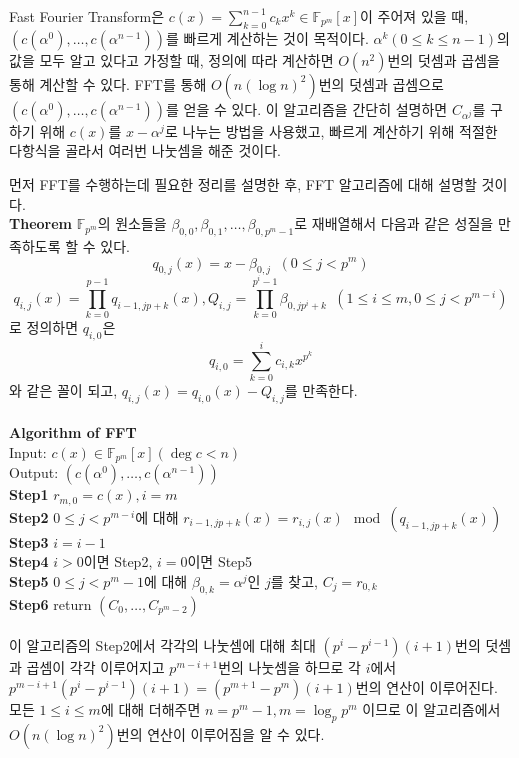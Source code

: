 \documentclass[11pt]{article}
\begin{document}
Fast Fourier Transform은 $c(x)=\sum_{k=0}^{n-1}c_{k}x^{k}\in\mathbb{F}_{p^{m}}[x]$이 주어져 있을 때,  $(c(\alpha^{0}),\dots,c(\alpha^{n-1}))$를 빠르게 계산하는 것이 목적이다. $\alpha^{k}(0\leq k\leq n-1)$의 값을 모두 알고 있다고 가정할 때, 정의에 따라 계산하면 $O(n^2)$번의 덧셈과 곱셈을 통해 계산할 수 있다.   FFT를 통해 $O(n(\log n)^2)$번의 덧셈과 곱셈으로 $(c(\alpha^{0}),\dots,c(\alpha^{n-1}))$를 얻을 수 있다. 이 알고리즘을 간단히 설명하면 $C_{\alpha^{j}}$를 구하기 위해 $c(x)$를 $x-\alpha^{j}$로 나누는 방법을 사용했고, 빠르게 계산하기 위해 적절한 다항식을 골라서 여러번 나눗셈을 해준 것이다.

먼저 FFT를 수행하는데 필요한 정리를 설명한 후, FFT 알고리즘에 대해 설명할 것이다. \\
\textbf{Theorem} $\mathbb{F}_{p^{m}}$의 원소들을 $\beta_{0,0},\beta_{0,1},\dots,\beta_{0,p^{m}-1}$로 재배열해서 다음과 같은 성질을 만족하도록 할 수 있다.
\begin{displaymath}
q_{0,j}(x)=x-\beta_{0,j}\phantom{a}(0\leq j<p^{m})
\end{displaymath}
\begin{displaymath}
q_{i,j}(x)=\prod_{k=0}^{p-1}q_{i-1,jp+k}(x),Q_{i,j}=\prod_{k=0}^{p^{i}-1}\beta_{0,jp^{i}+k}\phantom{a}(1\leq i\leq m,0\leq j< p^{m-i})
\end{displaymath}
로 정의하면 $q_{i,0}$은
\begin{displaymath}
q_{i,0}=\sum_{k=0}^{i}c_{i,k}x^{p^{k}}
\end{displaymath}
와 같은 꼴이 되고, $q_{i,j}(x)=q_{i,0}(x)-Q_{i,j}$를 만족한다.\\\\
{\large\textbf{Algorithm of FFT}}\\
Input: $c(x)\in\mathbb{F}_{p^{m}}[x](\deg c <n)$\\
Output: $(c(\alpha^{0}),\dots,c(\alpha^{n-1}))$\\
\textbf{Step1} $r_{m,0}=c(x),i=m$\.\\
\textbf{Step2} $0\leq j< p^{m-i}$에 대해 $r_{i-1,jp+k}(x)=r_{i,j}(x)\mod(q_{i-1,jp+k}(x))$\\
\textbf{Step3} $i=i-1$\\
\textbf{Step4} $i>0$이면 Step2, $i=0$이면 Step5\\
\textbf{Step5} $0\leq j< p^{m}-1$에 대해 $\beta_{0,k}=\alpha^{j}$인 $j$를 찾고, $C_{j}=r_{0,k}$\\
\textbf{Step6} return $(C_{0},\dots,C_{p^{m}-2})$\\\\
이 알고리즘의 Step2에서 각각의 나눗셈에 대해 최대 $(p^{i}-p^{i-1})(i+1)$번의 덧셈과 곱셈이 각각 이루어지고 $p^{m-i+1}$번의 나눗셈을 하므로 각 $i$에서 $p^{m-i+1}(p^{i}-p^{i-1})(i+1)=(p^{m+1}-p^{m})(i+1)$번의 연산이 이루어진다. 모든 $1\leq i\leq m$에 대해 더해주면 $n=p^{m}-1,m=\log_{p}p^{m}$ 이므로 이 알고리즘에서 $O(n(\log n)^{2})$번의 연산이 이루어짐을 알 수 있다.\\\\
\end{document}
